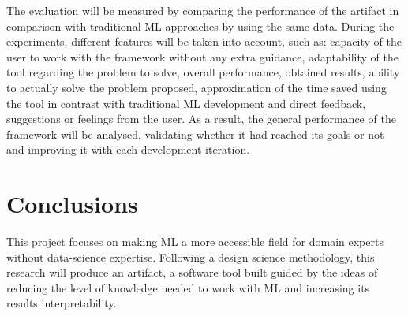 \documentclass[runningheads]{llncs}
\begin{document}
The evaluation will be measured by comparing the performance of the artifact in comparison with traditional ML approaches by using the same data. 
During the experiments, different features will be taken into account, such as: capacity of the user to work with the framework without any extra guidance, adaptability of the tool regarding the problem to solve, overall performance, obtained results, ability to actually solve the problem proposed, approximation of the time saved using the tool in contrast with traditional ML development and direct feedback, suggestions or feelings from the user. 
As a result, the general performance of the framework will be analysed, validating whether it had reached its goals or not and improving it with each development iteration.

\section{Conclusions}

This project focuses on making ML a more accessible field for domain experts without data-science expertise. 
 Following a design science methodology, this research will produce an artifact, a software tool built guided by the ideas of reducing the level of knowledge needed to work with ML and increasing its results interpretability. 

%
%
%


\end{document}
